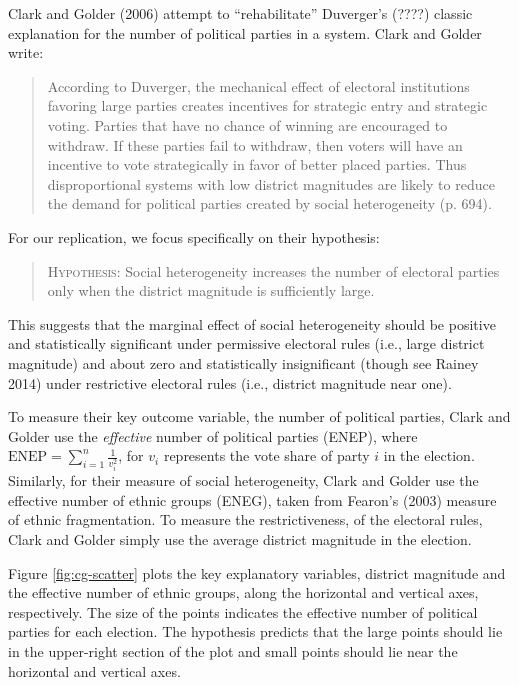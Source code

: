 \documentclass[12pt]{article}
\begin{document}
Clark and Golder (2006) attempt to ``rehabilitate'' Duverger's (????) classic explanation for the number of political parties in a system. Clark and Golder write: 

\begin{quote}
According to Duverger, the mechanical effect of electoral institutions favoring large parties creates incentives for strategic entry and strategic voting. Parties that have no chance of winning are encouraged to withdraw. If these parties fail to withdraw, then voters will have an incentive to vote strategically in favor of better placed parties. Thus disproportional systems with low district magnitudes are likely to reduce the demand for political parties created by social heterogeneity (p. 694).
\end{quote}

For our replication, we focus specifically on their hypothesis:
\begin{quote}
\textsc{Hypothesis:} Social heterogeneity increases the number of electoral parties only when the district magnitude is sufficiently large.
\end{quote}

This suggests that the marginal effect of social heterogeneity should be positive and statistically significant under permissive electoral rules (i.e., large district magnitude) and about zero and statistically insignificant (though see Rainey 2014) under restrictive electoral rules (i.e., district magnitude near one).

To measure their key outcome variable, the number of political parties, Clark and Golder use the \textit{effective} number of political parties (ENEP), where $\text{ENEP} = \sum_{i = 1}^n\frac{1}{v_i^2}$, for $v_i$ represents the vote share of party $i$ in the election. Similarly, for their measure of social heterogeneity, Clark and Golder use the effective number of ethnic groups (ENEG), taken from Fearon's (2003) measure of ethnic fragmentation. To measure the restrictiveness, of the electoral rules, Clark and Golder simply use the average district magnitude in the election. 

Figure \ref{fig:cg-scatter} plots the key explanatory variables, district magnitude and the effective number of ethnic groups, along the horizontal and vertical axes, respectively. The size of the points indicates the effective number of political parties for each election. The hypothesis predicts that the large points should lie in the upper-right section of the plot and small points should lie near the horizontal and vertical axes.
\end{document}
